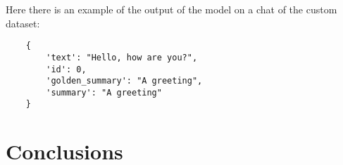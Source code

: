 \documentclass[10pt,twocolumn,letterpaper]{article}
\begin{document}
Here there is an example of the output of the model on a chat of the custom dataset:
\begin{lstlisting}
    {
        'text': "Hello, how are you?",
        'id': 0,
        'golden_summary': "A greeting",
        'summary': "A greeting"
    }
\end{lstlisting}
\section{Conclusions}





{\small


}
\end{document}
